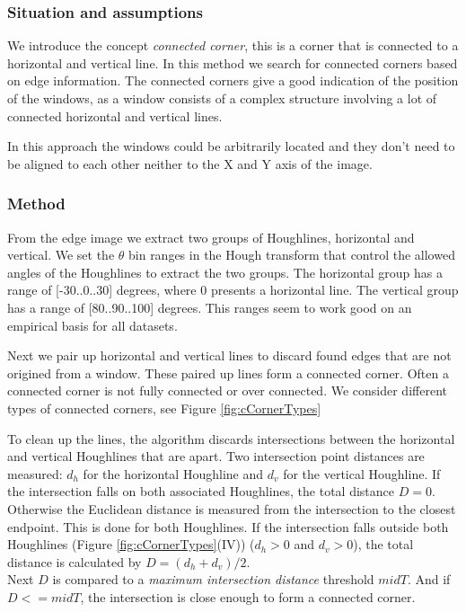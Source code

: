 \subsubsection{Situation and assumptions}
We introduce the concept \emph{connected corner}, this is a corner that is 
connected to a horizontal and vertical line.  
In this method we search for connected corners based on edge information.
The connected corners give a good indication of the position of the windows, as 
a window consists of a complex structure involving a lot of connected horizontal
and vertical lines. 

In this approach the windows could be arbitrarily located and they don't need
to be aligned to each other neither to the X and Y axis of the image.

\subsubsection{Method}
From the edge image we extract two groups of Houghlines, horizontal and
vertical.  We set the $\theta$ bin ranges in the Hough transform that control the
allowed angles of the Houghlines to extract the two groups. The horizontal group
has a range of [-30..0..30] degrees, where 0 presents a horizontal line. The vertical
group has a range of [80..90..100] degrees. This ranges seem
to work good on an empirical basis for all datasets.

Next we pair up horizontal and vertical lines to discard found edges that are
not origined from a window. These paired up lines form a connected corner.
Often a connected corner is not fully connected or over connected.
We consider different types of connected corners, see Figure \ref{fig:cCornerTypes} 

To clean up the lines, the algorithm discards intersections between the
horizontal and vertical Houghlines that are apart. 
Two intersection point distances are measured: $d_h$ for the horizontal Houghline and $d_v$
for the vertical Houghline.  If the intersection falls on both associated Houghlines,
	the total distance $D=0$.  Otherwise the Euclidean distance is measured from the
	intersection to the closest endpoint. This is done for both Houghlines.  If
	the intersection falls outside both Houghlines (Figure
	\ref{fig:cCornerTypes}(IV)) ($d_h>0$ and $d_v>0$), the total
	distance is calculated by $D=(d_h + d_v)/2$.\\
	Next $D$ is compared to
	a \emph{maximum intersection distance} threshold $midT$.  And if $D<=midT$,
	the intersection is close enough to form a connected corner.\\

